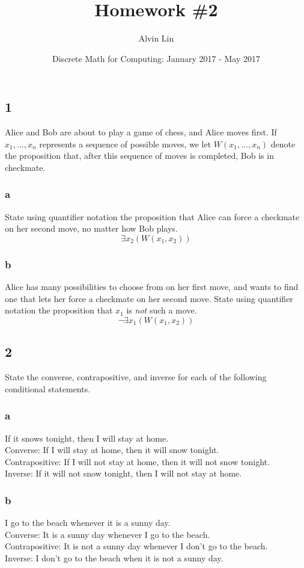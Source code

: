 \documentclass[letterpaper, 12pt]{math}
\title{Homework \#2}
\author{Alvin Lin}
\date{Discrete Math for Computing: January 2017 - May 2017}
\begin{document}
\maketitle

\subsection*{1}
Alice and Bob are about to play a game of chess, and Alice moves first. If
\( x_{1}, \dots, x_{n} \) represents a sequence of possible moves, we let
\( W(x_{1}, \dots, x_{n}) \) denote the proposition that, after this sequence
of moves is completed, Bob is in checkmate.

\subsubsection*{a}
State using quantifier notation the proposition that Alice can force a
checkmate on her second move, no matter how Bob plays.
\[ \exists{x_{2}}(W(x_{1}, x_{2})) \]

\subsubsection*{b}
Alice has many possibilities to choose from on her first move, and wants to
find one that lets her force a checkmate on her second move. State using
quantifier notation the proposition that \( x_{1} \) is \textit{not} such
a move.
\[ \neg{\exists{x_{1}}}(W(x_{1}, x_{2})) \]

\subsection*{2}
State the converse, contrapositive, and inverse for each of the following
conditional statements.

\subsubsection*{a}
If it snows tonight, then I will stay at home. \\
Converse: If I will stay at home, then it will snow tonight. \\
Contrapositive: If I will not stay at home, then it will not snow
tonight. \\
Inverse: If it will not snow tonight, then I will not stay at home.

\subsubsection*{b}
I go to the beach whenever it is a sunny day. \\
Converse: It is a sunny day whenever I go to the beach. \\
Contrapositive: It is not a sunny day whenever I don't go to the beach. \\
Inverse: I don't go to the beach when it is not a sunny day.
\end{document}
